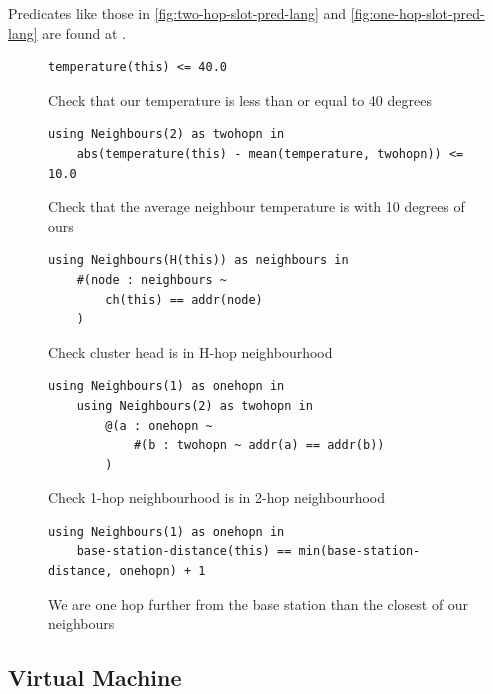 Predicates like those in \autoref{fig:two-hop-slot-pred-lang} and \autoref{fig:one-hop-slot-pred-lang} are found at \cite{DBLP:journals/corr/abs-0808-0920}.

\begin{figure}[H]
\begin{verbatim}
temperature(this) <= 40.0
\end{verbatim}
\caption{Check that our temperature is less than or equal to 40 degrees}
\end{figure}

\begin{figure}[H]
\begin{verbatim}
using Neighbours(2) as twohopn in
    abs(temperature(this) - mean(temperature, twohopn)) <= 10.0
\end{verbatim}
\caption{Check that the average neighbour temperature is with 10 degrees of ours}
\end{figure}


\begin{figure}[H]
\begin{verbatim}
using Neighbours(H(this)) as neighbours in
    #(node : neighbours ~
        ch(this) == addr(node)
    )
\end{verbatim}
\caption{Check cluster head is in H-hop neighbourhood}
\end{figure}



\begin{figure}[H]
\begin{verbatim}
using Neighbours(1) as onehopn in
    using Neighbours(2) as twohopn in
        @(a : onehopn ~
            #(b : twohopn ~ addr(a) == addr(b))
        )
\end{verbatim}
\caption{Check 1-hop neighbourhood is in 2-hop neighbourhood}
\end{figure}


\begin{figure}[H]
\begin{verbatim}
using Neighbours(1) as onehopn in
    base-station-distance(this) == min(base-station-distance, onehopn) + 1
\end{verbatim}
\caption{We are one hop further from the base station than the closest of our neighbours}
\end{figure}


\subsection{Virtual Machine}

